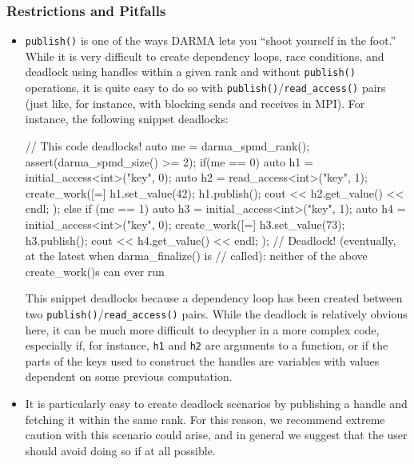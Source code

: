 \begin{subs}
\subsubsection{Restrictions and Pitfalls}
\begin{itemize}
  \item \texttt{publish()} is one of the ways DARMA lets you ``shoot yourself in
  the foot.''  While it is very difficult to create dependency loops, race
  conditions, and deadlock using handles within a given rank and without
  \texttt{publish()} operations, it is quite easy to do so with
  \texttt{publish()}/\texttt{read\_access()} pairs (just like, for instance,
  with blocking sends and receives in MPI).  For instance, the following snippet
  deadlocks:
\begin{minipage}[t]{1\linewidth}%
  \centering
  \begin{CppCode}
// This code deadlocks!
auto me = darma_spmd_rank();
assert(darma_spmd_size() >= 2);
if(me == 0) {
  auto h1 = initial_access<int>("key", 0);
  auto h2 = read_access<int>("key", 1);
  create_work([=]{ 
    h1.set_value(42);
    h1.publish();
    cout << h2.get_value() << endl;
  }); 
}
else if (me == 1) {
  auto h3 = initial_access<int>("key", 1);
  auto h4 = initial_access<int>("key", 0);
  create_work([=]{ 
    h3.set_value(73);
    h3.publish();
    cout << h4.get_value() << endl; 
  }); 
}
// Deadlock! (eventually, at the latest when darma_finalize() is
// called): neither of the above create_work()s can ever run
  \end{CppCode}
\end{minipage}
  This snippet deadlocks because a dependency loop has been created between two
  \texttt{publish()}/\texttt{read\_access()} pairs. While the deadlock is
  relatively obvious here, it can be much more difficult to decypher in a more
  complex code, especially if, for instance, \texttt{h1} and \texttt{h2} are
  arguments to a function, or if the parts of the keys used to construct the
  handles are variables with values dependent on some previous computation.
  \item It is particularly easy to create deadlock scenarios by publishing a
  handle and fetching it within the same rank.  For this reason, we recommend
  extreme caution with this scenario could arise, and in general we suggest that
  the user should avoid doing so if at all possible.

\end{itemize}
\end{subs}
